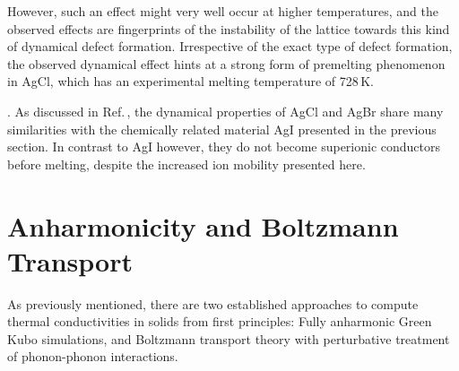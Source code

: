 %
%
However, such an effect might very well occur at higher temperatures, and the observed effects are fingerprints of the instability of the lattice towards this kind of dynamical defect formation.
Irrespective of the exact type of defect formation, %
the observed dynamical effect hints at a strong form of premelting phenomenon in AgCl, which has an experimental melting temperature of 728\,K.

. As discussed in Ref.\,\cite{Andreoni.1983}, the dynamical properties of AgCl and AgBr share many similarities with the chemically related material AgI presented in the previous section. In contrast to AgI however, they do not become superionic conductors before melting, despite the increased ion mobility presented here.

\section{Anharmonicity and Boltzmann Transport}
As previously mentioned, there are two established approaches to compute thermal conductivities in solids from first principles: Fully anharmonic Green Kubo simulations, and Boltzmann transport theory with perturbative treatment of phonon-phonon interactions. 

